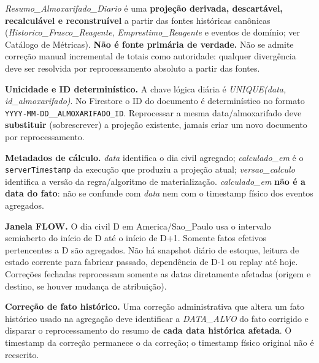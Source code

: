 \begin{explicacao}
\textit{Resumo\_Almoxarifado\_Diario} é uma \textbf{projeção derivada, descartável, recalculável e reconstruível} a partir das fontes históricas canônicas (\textit{Historico\_Frasco\_Reagente}, \textit{Emprestimo\_Reagente} e eventos de domínio; ver Catálogo de Métricas). \textbf{Não é fonte primária de verdade.} Não se admite correção manual incremental de totais como autoridade: qualquer divergência deve ser resolvida por reprocessamento absoluto a partir das fontes.

\textbf{Unicidade e ID determinístico.} A chave lógica diária é \textit{UNIQUE(data, id\_almoxarifado)}. No Firestore o ID do documento é determinístico no formato \texttt{YYYY-MM-DD\_\_ALMOXARIFADO\_ID}. Reprocessar a mesma data/almoxarifado deve \textbf{substituir} (sobrescrever) a projeção existente, jamais criar um novo documento por reprocessamento.

\textbf{Metadados de cálculo.} \textit{data} identifica o dia civil agregado; \textit{calculado\_em} é o \texttt{serverTimestamp} da execução que produziu a projeção atual; \textit{versao\_calculo} identifica a versão da regra/algoritmo de materialização. \textit{calculado\_em} \textbf{não é a data do fato}: não se confunde com \textit{data} nem com o timestamp físico dos eventos agregados.

\textbf{Janela FLOW.} O dia civil D em America/Sao\_Paulo usa o intervalo semiaberto do início de D até o início de D+1. Somente fatos efetivos pertencentes a D são agregados. Não há snapshot diário de estoque, leitura de estado corrente para fabricar passado, dependência de D-1 ou replay até hoje. Correções fechadas reprocessam somente as datas diretamente afetadas (origem e destino, se houver mudança de atribuição).

\textbf{Correção de fato histórico.} Uma correção administrativa que altera um fato histórico usado na agregação deve identificar a \textit{DATA\_ALVO} do fato corrigido e disparar o reprocessamento do resumo de \textbf{cada data histórica afetada}. O timestamp da correção permanece o da correção; o timestamp físico original não é reescrito.
\end{explicacao}
\newpage
